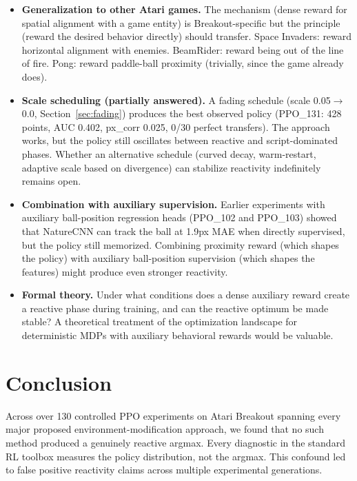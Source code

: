 \documentclass[11pt]{article}
\begin{document}
\begin{itemize}
    \item \textbf{Generalization to other Atari games.} The mechanism
    (dense reward for spatial alignment with a game entity) is Breakout-specific
    but the principle (reward the desired behavior directly) should transfer.
    Space Invaders: reward horizontal alignment with enemies. BeamRider: reward
    being out of the line of fire. Pong: reward paddle-ball proximity (trivially,
    since the game already does).

    \item \textbf{Scale scheduling (partially answered).} A fading schedule
    (scale 0.05$\to$0.0, Section~\ref{sec:fading}) produces the best observed
    policy (PPO\_131: 428 points, AUC 0.402, px\_corr 0.025, 0/30 perfect
    transfers). The approach works, but the policy still oscillates between
    reactive and script-dominated phases. Whether an alternative schedule
    (curved decay, warm-restart, adaptive scale based on divergence) can
    stabilize reactivity indefinitely remains open.

    \item \textbf{Combination with auxiliary supervision.} Earlier experiments
    with auxiliary ball-position regression heads (PPO\_102 and PPO\_103)
    showed that NatureCNN can track the ball at 1.9px MAE when directly
    supervised, but the policy still memorized. Combining proximity reward
    (which shapes the policy) with auxiliary ball-position
    supervision (which shapes the features) might produce even stronger
    reactivity.

    \item \textbf{Formal theory.} Under what conditions does a dense auxiliary
    reward create a reactive phase during training, and can the reactive
    optimum be made stable? A theoretical treatment of the optimization
    landscape for deterministic MDPs with auxiliary behavioral rewards would
    be valuable.
\end{itemize}

\section{Conclusion}

Across over 130 controlled PPO experiments on Atari Breakout spanning every
major proposed environment-modification approach, we found that no such method
produced a genuinely reactive argmax. Every diagnostic in the standard
RL toolbox measures the policy distribution, not the argmax. This confound
led to false positive reactivity claims across multiple experimental
generations.
\end{document}
